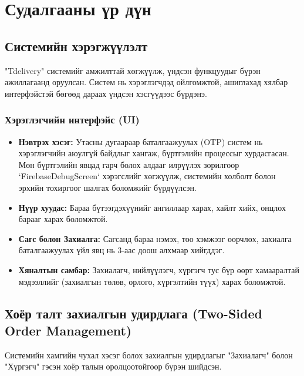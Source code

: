 
\section{Судалгааны үр дүн}

\subsection{Системийн хэрэгжүүлэлт}
"Tdelivery" системийг амжилттай хөгжүүлж, үндсэн функцуудыг бүрэн ажиллагаанд оруулсан. Систем нь хэрэглэгчдэд ойлгомжтой, ашиглахад хялбар интерфэйстэй бөгөөд дараах үндсэн хэсгүүдээс бүрдэнэ.

\subsubsection{Хэрэглэгчийн интерфэйс (UI)}
\begin{itemize}
    \item \textbf{Нэвтрэх хэсэг:} Утасны дугаараар баталгаажуулах (OTP) систем нь хэрэглэгчийн аюулгүй байдлыг хангаж, бүртгэлийн процессыг хурдасгасан. Мөн бүртгэлийн явцад гарч болох алдааг илрүүлэх зорилгоор `FirebaseDebugScreen` хэрэгслийг хөгжүүлж, системийн холболт болон эрхийн тохиргоог шалгах боломжийг бүрдүүлсэн.
    \item \textbf{Нүүр хуудас:} Бараа бүтээгдэхүүнийг ангиллаар харах, хайлт хийх, онцлох барааг харах боломжтой.
    \item \textbf{Сагс болон Захиалга:} Сагсанд бараа нэмэх, тоо хэмжээг өөрчлөх, захиалга баталгаажуулах үйл явц нь 3-аас доош алхмаар хийгддэг.
    \item \textbf{Хяналтын самбар:} Захиалагч, нийлүүлэгч, хүргэгч тус бүр өөрт хамааралтай мэдээллийг (захиалгын төлөв, орлого, хүргэлтийн түүх) харах боломжтой.
\end{itemize}

\subsection{Хоёр талт захиалгын удирдлага (Two-Sided Order Management)}
Системийн хамгийн чухал хэсэг болох захиалгын удирдлагыг "Захиалагч" болон "Хүргэгч" гэсэн хоёр талын оролцоотойгоор бүрэн шийдсэн.

